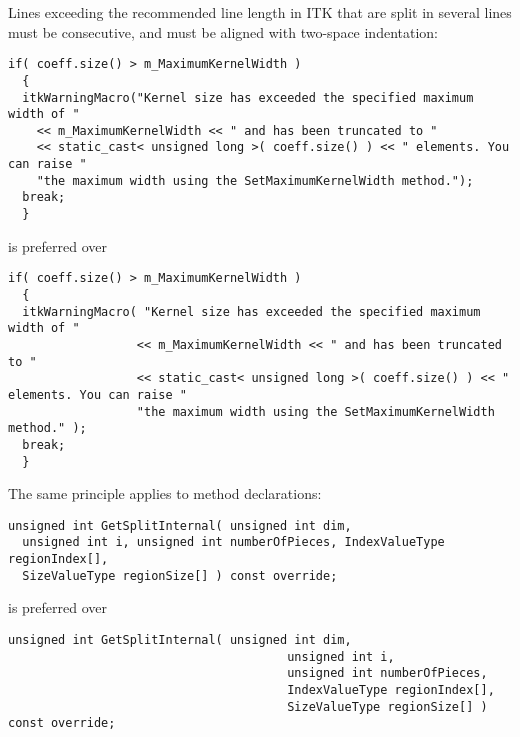 Lines exceeding the recommended line length in ITK that are split in several
lines must be consecutive, and must be aligned with two-space indentation:

\small
\begin{verbatim}
if( coeff.size() > m_MaximumKernelWidth )
  {
  itkWarningMacro("Kernel size has exceeded the specified maximum width of "
    << m_MaximumKernelWidth << " and has been truncated to "
    << static_cast< unsigned long >( coeff.size() ) << " elements. You can raise "
    "the maximum width using the SetMaximumKernelWidth method.");
  break;
  }
\end{verbatim}
\normalsize

is preferred over

\small
\begin{verbatim}
if( coeff.size() > m_MaximumKernelWidth )
  {
  itkWarningMacro( "Kernel size has exceeded the specified maximum width of "
                  << m_MaximumKernelWidth << " and has been truncated to "
                  << static_cast< unsigned long >( coeff.size() ) << " elements. You can raise "
                  "the maximum width using the SetMaximumKernelWidth method." );
  break;
  }
\end{verbatim}
\normalsize

The same principle applies to method declarations:

\small
\begin{verbatim}
unsigned int GetSplitInternal( unsigned int dim,
  unsigned int i, unsigned int numberOfPieces, IndexValueType regionIndex[],
  SizeValueType regionSize[] ) const override;
\end{verbatim}
\normalsize

is preferred over

\small
\begin{verbatim}
unsigned int GetSplitInternal( unsigned int dim,
                                       unsigned int i,
                                       unsigned int numberOfPieces,
                                       IndexValueType regionIndex[],
                                       SizeValueType regionSize[] ) const override;
\end{verbatim}
\normalsize


